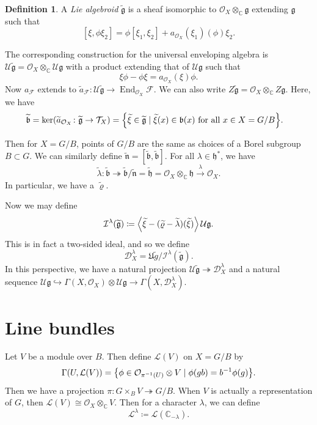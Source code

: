 \documentclass[leqno, openany]{memoir}
\theoremstyle{definition}
\newtheorem{defn}[thm]{Definition}
\theoremstyle{remark}
\theoremstyle{plain}
\theoremstyle{definition}
\theoremstyle{remark}
\newcommand{\C}{\mathbb{C}}
\newcommand{\g}{\mathfrak{g}}
\newcommand{\mc}[1]{\mathcal{#1}}
\newcommand{\mf}[1]{\mathfrak{#1}}
\newcommand{\wt}[1]{\widetilde{#1}}
\DeclareMathOperator{\End}{End}
\begin{document}
\begin{defn}
    A \textit{Lie algebroid} $\wt{\g}$ is a sheaf isomorphic to $\mc{O}_X \otimes_{\C} \mf{g}$ extending $\mf{g}$ such that
    \[ [\xi, \phi \xi_2] = \phi [\xi_1, \xi_2] + a_{\mc{O}_X}(\xi_1)(\phi)\xi_2. \]
\end{defn}

The corresponding construction for the universal enveloping algebra is $\mc{U} \wt{\g} = \mc{O}_X \otimes_{\C} \mc{U} \g$ with a product extending that of $\mc{U} \g$ such that
\[ \xi \phi - \phi \xi = a_{\mc{O}_X}(\xi)\phi. \]
Now $a_{\mc{F}}$ extends to $\wt{a}_{\mc{F}} \colon \mc{U} \wt{\g} \to \End_{\mc{O}_X} \mc{F}$. We can also write $Z \wt{\g} = \mc{O}_X \otimes_{\C} Z \g$. Here, we have
\begin{align*}
    \wt{\mf{b}} = \ker(\wt{a}_{\mc{O}_X} \colon \wt{\g} \to \mc{T}_X) &= \qty{\wt{\xi} \in \wt{\g} \mid \wt{\xi}(x) \in \mf{b}(x) \text{ for all }x \in X = G/B}.
\end{align*}

Then for $X = G/B$, points of $G/B$ are the same as choices of a Borel subgroup $B \subset G$. We can similarly define $\wt{\mf{n}} = [\wt{\mf{b}}, \wt{\mf{b}}]$. For all $\lambda \in \mf{h}^*$, we have
\[ \wt{\lambda} \colon \wt{\mf{b}} \twoheadrightarrow \wt{\mf{b}} / \wt{\mf{n}} = \wt{\mf{h}} = \mc{O}_X \otimes_{\C} \mf{h} \xrightarrow{\lambda} \mc{O}_X. \]
In particular, we have a $\wt{\varrho}$.

Now we may define
\[ \mc{I}^{\lambda}(\wt{\g}) \coloneqq \ev{\wt{\xi} - (\wt{\varrho} - \wt{\lambda})(\wt{\xi})} \mc{U} \g. \]
This is in fact a two-sided ideal, and so we define
\[ \mc{D}_X^{\lambda} = \mf{U} \wt{g} / \mc{I}^{\lambda}(\wt{\g}). \]
In this perspective, we have a natural projection $\mc{U} \wt{\g} \twoheadrightarrow \mc{D}_X^{\lambda}$ and a natural sequence $\mc{U} \g \hookrightarrow \Gamma(X, \mc{O}_X) \otimes \mc{U} \g \to \Gamma(X, \mc{D}_X^{\lambda})$.

\section{Line bundles}

Let $V$ be a module over $B$. Then define $\mc{L}(V)$ on $X = G/B$ by
\[ \Gamma(U, \mc{L}(V)) = \qty{\phi \in \mc{O}_{\pi^{-1}(U)} \otimes V \mid \phi(gb) = b^{-1} \phi(g)}. \]
Then we have a projection $\pi \colon G \times_B V \twoheadrightarrow G/B$. When $V$ is actually a representation of $G$, then $\mc{L}(V) \cong \mc{O}_X \otimes_{\C} V$. Then for a character $\lambda$, we can define
\[ \mc{L}^{\lambda} \coloneqq \mc{L}(\C_{-\lambda}). \]
\end{document}
